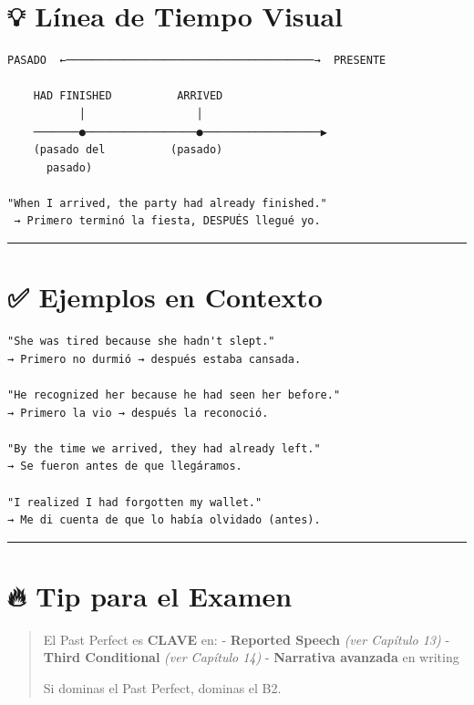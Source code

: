 \documentclass[
  spanish,
  letterpaper,
]{scrbook}
\begin{document}
\section{💡 Línea de Tiempo Visual}\label{luxednea-de-tiempo-visual}

\begin{verbatim}
PASADO  ←──────────────────────────────────────→  PRESENTE

    HAD FINISHED          ARRIVED
           │                 │
    ───────●─────────────────●──────────────────▶
    (pasado del          (pasado)
      pasado)

"When I arrived, the party had already finished."
 → Primero terminó la fiesta, DESPUÉS llegué yo.
\end{verbatim}

\begin{center}\rule{0.5\linewidth}{0.5pt}\end{center}

\section{✅ Ejemplos en Contexto}\label{ejemplos-en-contexto}

\begin{verbatim}
"She was tired because she hadn't slept."
→ Primero no durmió → después estaba cansada.

"He recognized her because he had seen her before."
→ Primero la vio → después la reconoció.

"By the time we arrived, they had already left."
→ Se fueron antes de que llegáramos.

"I realized I had forgotten my wallet."
→ Me di cuenta de que lo había olvidado (antes).
\end{verbatim}

\begin{center}\rule{0.5\linewidth}{0.5pt}\end{center}

\section{🔥 Tip para el Examen}\label{tip-para-el-examen-3}

\begin{quote}
El Past Perfect es \textbf{CLAVE} en: - \textbf{Reported Speech}
\emph{(ver Capítulo 13)} - \textbf{Third Conditional} \emph{(ver
Capítulo 14)} - \textbf{Narrativa avanzada} en writing

Si dominas el Past Perfect, dominas el B2.
\end{quote}
\end{document}
